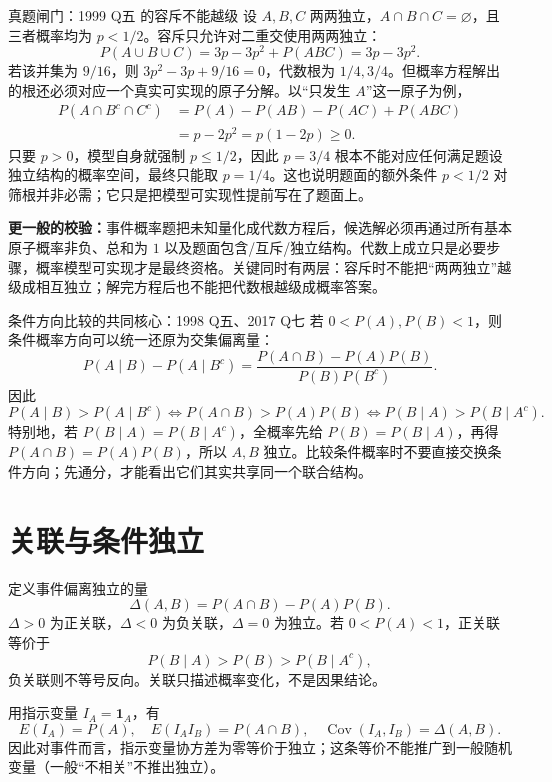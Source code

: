 \documentclass[11pt,a4paper]{ctexart}
\begin{document}
\begin{examplebox}{真题闸门：1999 Q五 的容斥不能越级}
设 $A,B,C$ 两两独立，$A\cap B\cap C=\varnothing$，且三者概率均为 $p<1/2$。容斥只允许对二重交使用两两独立：
\[
P(A\cup B\cup C)=3p-3p^2+P(ABC)=3p-3p^2.
\]
若该并集为 $9/16$，则 $3p^2-3p+9/16=0$，代数根为 $1/4,3/4$。但概率方程解出的根还必须对应一个真实可实现的原子分解。以“只发生 $A$”这一原子为例，
\[
\begin{aligned}
P(A\cap B^c\cap C^c)
&=P(A)-P(AB)-P(AC)+P(ABC)\\
&=p-2p^2=p(1-2p)\ge0.
\end{aligned}
\]
只要 $p>0$，模型自身就强制 $p\le1/2$，因此 $p=3/4$ 根本不能对应任何满足题设独立结构的概率空间，最终只能取 $p=1/4$。这也说明题面的额外条件 $p<1/2$ 对筛根并非必需；它只是把模型可实现性提前写在了题面上。

\textbf{更一般的校验：}事件概率题把未知量化成代数方程后，候选解必须再通过所有基本原子概率非负、总和为 $1$ 以及题面包含/互斥/独立结构。代数上成立只是必要步骤，概率模型可实现才是最终资格。关键同时有两层：容斥时不能把“两两独立”越级成相互独立；解完方程后也不能把代数根越级成概率答案。
\end{examplebox}

\begin{examplebox}{条件方向比较的共同核心：1998 Q五、2017 Q七}
若 $0<P(A),P(B)<1$，则条件概率方向可以统一还原为交集偏离量：
\[
P(A\mid B)-P(A\mid B^c)
=\frac{P(A\cap B)-P(A)P(B)}{P(B)P(B^c)}.
\]
因此
\[
P(A\mid B)>P(A\mid B^c)
\Longleftrightarrow P(A\cap B)>P(A)P(B)
\Longleftrightarrow P(B\mid A)>P(B\mid A^c).
\]
特别地，若 $P(B\mid A)=P(B\mid A^c)$，全概率先给 $P(B)=P(B\mid A)$，再得 $P(A\cap B)=P(A)P(B)$，所以 $A,B$ 独立。比较条件概率时不要直接交换条件方向；先通分，才能看出它们其实共享同一个联合结构。
\end{examplebox}

\section{关联与条件独立}

定义事件偏离独立的量
\[
\Delta(A,B)=P(A\cap B)-P(A)P(B).
\]
$\Delta>0$ 为正关联，$\Delta<0$ 为负关联，$\Delta=0$ 为独立。若 $0<P(A)<1$，正关联等价于
\[
P(B\mid A)>P(B)>P(B\mid A^c),
\]
负关联则不等号反向。关联只描述概率变化，不是因果结论。

用指示变量 $I_A=\mathbf1_A$，有
\[
E(I_A)=P(A),\quad E(I_AI_B)=P(A\cap B),\quad
\operatorname{Cov}(I_A,I_B)=\Delta(A,B).
\]
因此对事件而言，指示变量协方差为零等价于独立；这条等价不能推广到一般随机变量（一般“不相关”不推出独立）。
\end{document}

